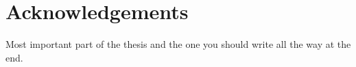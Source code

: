 
\chapter{Acknowledgements}
\thispagestyle{noheadrule}
Most important part of the thesis and the one you should write all the way at the end.
